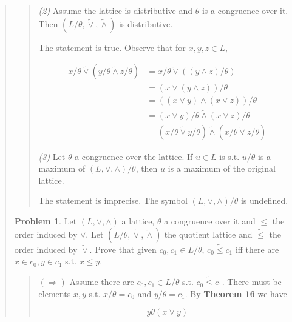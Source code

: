 \documentclass[a4paper, 12pt]{article}
\theoremstyle{definition}
\newtheorem{problem}{Problem}
\theoremstyle{definition}
\theoremstyle{definition}
\begin{document}
\begin{quote}
\begin{quote}
\textit{(2)} Assume the lattice is distributive and $\theta$ is a congruence 
over it. Then $(L / \theta, \widetilde{ \lor  }, \widetilde{ \land  })$ is 
distributive.

The statement is true. Observe that for $x, y, z \in L$,

\begin{align*}
    x / \theta \widetilde{ \lor  } (y / \theta \widetilde{ \land  } z / \theta) &= x / \theta \widetilde{ \lor  } \left( \left( y \land  z \right) / \theta    \right)  \\ 
    &= \left( x \lor \left( y \land  z \right)  \right) /\theta \\ 
    &= \left( \left( x \lor  y \right) \land \left( x \lor  z \right)   \right) /\theta \\ 
    &=\left( x \lor  y \right) / \theta \widetilde{ \land  } \left( x \lor  z \right) / \theta \\ 
    &= \left( x /\theta \widetilde{ \lor  } y / \theta \right)  \widetilde{ \land  } \left( x / \theta  \widetilde{  \lor  } z / \theta\right) 
\end{align*}



\textit{(3)} Let $\theta$ a congruence over the lattice. If $u \in L$
is s.t. $u / \theta$ is a maximum of $(L, \lor , \land ) / \theta$,
then $u$ is a maximum of the original lattice.

The statement is imprecise. The symbol $(L, \lor , \land ) / \theta$
is undefined.


\end{quote}
\normalsize

\begin{problem}
    Let $(L, \lor , \land )$ a lattice, $\theta$ a congruence over it and 
    $\leq$ the order induced by $\lor $. Let $(L / \theta, \widetilde{\lor}, \widetilde{\land})$ the quotient lattice and $\widetilde{ \leq } $ the order induced by 
    $\widetilde{ \lor  } $. Prove that given $c_0, c_1 \in L / \theta$, 
    $c_0 \widetilde{ \leq }  c_1$ iff there are $x \in c_0, y \in c_1$ s.t. $x \leq y$.
\end{problem}


\small
\begin{quote}

$(\Rightarrow)$ Assume there are $c_0, c_1 \in L / \theta$ s.t. $c_0
\widetilde{ \leq } c_1 $. There must be elements $x, y$
s.t. $x / \theta = c_0$ and $y / \theta = c_1$.
By \textbf{Theorem 16} we have 

\begin{equation}
    y\theta(x \lor  y)
\end{equation}


\end{quote}
\end{quote}
\end{document}
